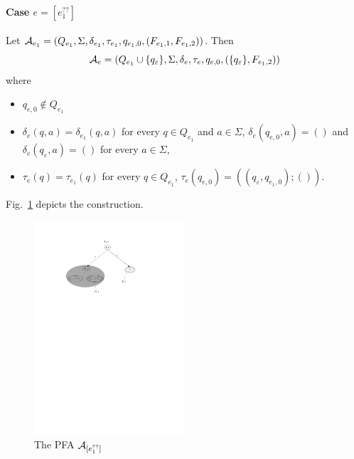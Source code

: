 \paragraph{Case $e = [e_1^{??}]$} 
Let $\mathcal{A}_{e_1} = (Q_{e_1},
		\Sigma, \delta_{e_1}, \tau_{e_1}, q_{e_1,0}, (F_{e_1,1}, F_{e_1,2}))$. 
Then 
\[\mathcal{A}_e = (Q_{e_1} \cup \{q_{\varepsilon}\}, \Sigma,
		\delta_e, \tau_e, q_{e,0}, (\{q_{\varepsilon}\}, F_{e_1,2}))\] 
where 
		\begin{itemize}
			\item $q_{e,0}  \not \in Q_{e_1}$
			\item $\delta_e(q, a) = \delta_{e_1}(q, a)$ for every $q \in Q_{e_1}$ and $a \in \Sigma$, $\delta_e(q_{e,0}, a)  = ()$ and $\delta_e(q_{\varepsilon}, a) = ()$ for every $a \in \Sigma$, 
			\item $\tau_e(q) = \tau_{e_1}(q)$ for every $q \in Q_{e_1}$, $\tau_e(q_{e,0}) = ((q_{\varepsilon}, q_{e_1,0}); ())$.
		\end{itemize}
Fig.~\ref{fig-reg2pfa-7} depicts the construction. 
		\begin{figure}[ht]
			\centering
			\includegraphics[width = 0.5\textwidth]{reg2pfa-7.pdf}
			\caption{The PFA $\mathcal{A}_{[e_1^{??}]}$}
			\label{fig-reg2pfa-7}
		\end{figure}
	
